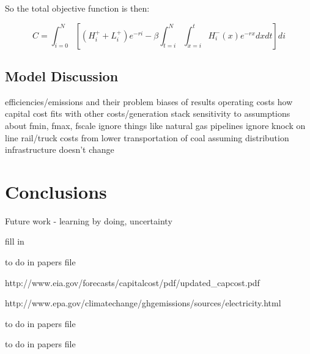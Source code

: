 \documentclass{easychithesis}
\begin{document}
So the total objective function is then:

\begin{equation}
C = \int_{i=0}^N  \left[ (H^+_i + L^+_i)e^{-ri}  - \beta  \int_{t=i}^N \int_{x=i}^t H^-_i(x)e^{-rx} dx dt\right] di
\end{equation}





\section{Model Discussion}

efficiencies/emissions and their problem
biases of results
operating costs 
how capital cost fits with other costs/generation stack
sensitivity to assumptions about fmin, fmax, fscale
ignore things like natural gas pipelines
ignore knock on line rail/truck costs from lower transportation of coal
assuming distribution infrastructure doesn't change


\chapter{Conclusions}

Future work - learning by doing, uncertainty




\singlespacing
\pagebreak
{}

\begin{thebibliography}{99}

fill in

to do in papers file


http://www.eia.gov/forecasts/capitalcost/pdf/updated\_capcost.pdf

http://www.epa.gov/climatechange/ghgemissions/sources/electricity.html

to do in papers file

to do in papers file


\end{thebibliography}
\end{document}
